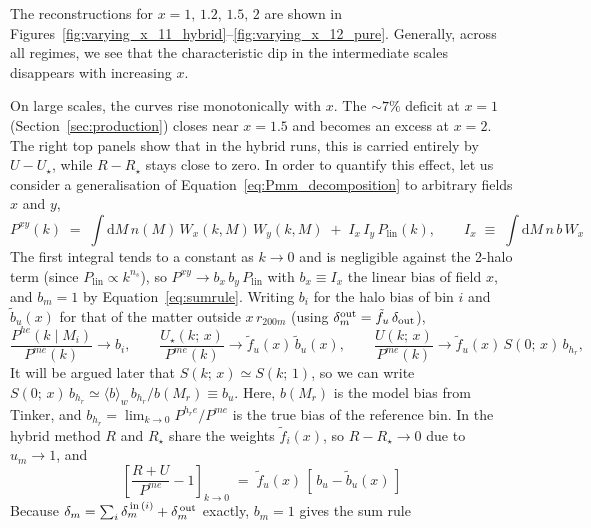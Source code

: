 \documentclass{article}
\newcommand{\dd}{\mathrm{d}}
\begin{document}
 
 
 
The reconstructions for $x = 1,\,1.2,\,1.5,\,2$ are shown in Figures~\ref{fig:varying_x_11_hybrid}--\ref{fig:varying_x_12_pure}. Generally, across all regimes, we see that the characteristic dip in the intermediate scales disappears with increasing $x$.

On large scales, the curves rise monotonically with $x$. The $\sim 7\%$ deficit at $x=1$ (Section~\ref{sec:production}) closes near $x=1.5$ and becomes an excess at $x=2$.
The right top panels show that in the hybrid runs, this is carried entirely by $U - U_\star$, while $R - R_\star$ stays close to zero. In order to quantify this effect, let us consider a generalisation of Equation~\eqref{eq:Pmm_decomposition} to arbitrary fields $x$ and $y$,
\begin{equation}
    P^{xy}(k) \;=\; \int \dd M \, n(M) \, W_x(k,M) \, W_y(k,M) \;+\; I_x \, I_y \, P_\mathrm{lin}(k), \qquad I_x \;\equiv\; \int \dd M \, n \, b \, W_x
    \label{eq:Pxy}
\end{equation}
The first integral tends to a constant as $k\to0$ and is negligible against the 2-halo term (since $P_\mathrm{lin} \propto k^{n_s}$), so $P^{xy} \to b_x\, b_y\, P_\mathrm{lin}$ with $b_x \equiv I_x$ the linear bias of field $x$, and $b_m = 1$ by Equation~\eqref{eq:sumrule}. Writing $b_i$ for the halo bias of bin $i$ and $\tilde b_u(x)$ for that of the matter outside $x\,r_{200m}$ (using $\delta_m^{\rm out} = \tilde f_u\,\delta_{\rm out}$),
\begin{equation}
    \frac{P^{he}(k\mid M_i)}{P^{me}(k)} \to b_i, \qquad
    \frac{U_\star(k;\,x)}{P^{me}(k)} \to \tilde f_u(x)\, \tilde b_u(x), \qquad
    \frac{U(k;\,x)}{P^{me}(k)} \to \tilde f_u(x)\, S(0; \, x) \, b_{h_r},
    \label{eq:LS-limits}
\end{equation}
It will be argued later that $S(k; \, x) \simeq S(k; \, 1)$, so we can write $S(0; \, x) \, b_{h_r} \simeq \langle b\rangle_w\, b_{h_r}/b(M_r) \equiv b_u$. Here, $b(M_r)$ is the model bias from Tinker, and $b_{h_r} = \lim _{k \to 0} P^{h_re}/P^{me}$ is the true bias of the reference bin. In the hybrid method $R$ and $R_\star$ share the weights $\tilde f_i(x)$, so $R - R_\star \to 0$ due to $u_m \to 1$, and
\begin{equation}
    \left[\frac{R+U}{P^{me}} - 1 \right]_{k\to0} \;=\; \tilde f_u(x)\,\left[\,b_u  - \tilde b_u(x) \,\right]
    \label{eq:LS-error}
\end{equation}
Because $\delta_m = \sum_i \delta_m^{\,\mathrm{in} \,(i)} + \delta_m^{\,\rm out}$ exactly, $b_m = 1$ gives the sum rule
\end{document}
